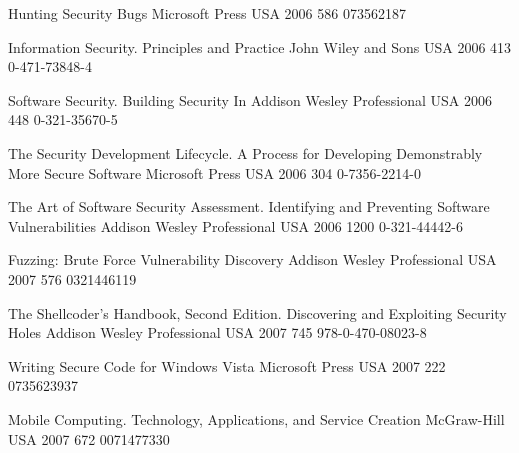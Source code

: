 \begin{thebibliography}{9}
		{
			\biband
			\biband
			}
		{Hunting Security Bugs}
		{}
		{Microsoft Press}
		{USA}
		{2006}
		{586}
		{073562187}
	
		{}
		{Information Security. Principles and Practice}
		{}
		{John Wiley and Sons}
		{USA}
		{2006}
		{413}
		{0-471-73848-4}
	
		{}
		{Software Security. Building Security In}
		{}
		{Addison Wesley Professional}
		{USA}
		{2006}
		{448}
		{0-321-35670-5}
	
		{
			\biband
			}
		{The Security Development Lifecycle. A Process for Developing Demonstrably More Secure Software}
		{}
		{Microsoft Press}
		{USA}
		{2006}
		{304}
		{0-7356-2214-0}
	
		{
			\biband
			\biband
			}
		{The Art of Software Security Assessment. Identifying and Preventing Software Vulnerabilities}
		{}
		{Addison Wesley Professional}
		{USA}
		{2006}
		{1200}
		{0-321-44442-6}
	
		{
			\biband
			\biband
			}
		{Fuzzing: Brute Force Vulnerability Discovery}
		{}
		{Addison Wesley Professional}
		{USA}
		{2007}
		{576}
		{0321446119}
	
		{
			\biband
			\biband
			\biband
			}
		{The Shellcoder's Handbook, Second Edition. Discovering and Exploiting Security Holes}
		{}
		{Addison Wesley Professional}
		{USA}
		{2007}
		{745}
		{978-0-470-08023-8}
	
		{
			\biband
			}
		{Writing Secure Code for {W}indows {V}ista}
		{}
		{Microsoft Press}
		{USA}
		{2007}
		{222}
		{0735623937}
	
		{
			\biband
			}
		{Mobile Computing. Technology, Applications, and Service Creation}
		{}
		{McGraw-Hill}
		{USA}
		{2007}
		{672}
		{0071477330}
	

\end{thebibliography}
